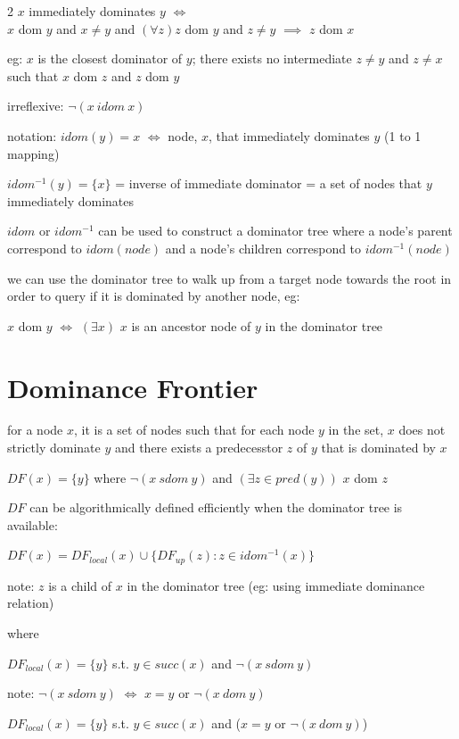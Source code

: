 \documentclass[8pt]{extarticle}
\begin{document}
\begin{multicols*}{2}
  $x$ immediately dominates $y$ $\iff$\\
  $x$ dom $y$ and $x \neq y$ and $(\forall z) z$ dom $y$ and $z \neq y$ $\implies$ $z$ dom $x$

  eg: $x$ is the closest dominator of $y$; there exists no intermediate $z \neq y$ and $z \neq x$ such that $x$ dom $z$ and $z$ dom $y$

  irreflexive: $\neg(x\ idom\ x)$

  notation: $idom(y) = x$ $\iff$ node, $x$, that immediately dominates $y$ (1 to 1 mapping)

  $idom^{-1}(y) = \{ x \}$ = inverse of immediate dominator = a set of nodes that $y$ immediately dominates

  $idom$ or $idom^{-1}$ can be used to construct a dominator tree where a node's parent correspond to $idom(node)$ and a node's children correspond to $idom^{-1}(node)$

  we can use the dominator tree to walk up from a target node towards the root in order to query if it is dominated by another node, eg:
  
  $x$ dom $y$ $\iff$ $(\exists x)$ $x$ is an ancestor node of $y$ in the dominator tree

  \vfill\null
  \columnbreak
    
  \section{Dominance Frontier}

  for a node $x$, it is a set of nodes such that for each node $y$ in the set, $x$ does not strictly dominate $y$ and there exists a predecesstor $z$ of $y$ that is dominated by $x$

  $DF(x) = \{ y \}$ where $\neg(x\ sdom\ y)$ and $(\exists z \in pred(y))$ $x$ dom $z$

  $DF$ can be algorithmically defined efficiently when the dominator tree is available:

  $DF(x) = DF_{local}(x) \cup \{ DF_{up}(z) : z \in idom^{-1}(x) \}$

  note: $z$ is a child of $x$ in the dominator tree (eg: using immediate dominance relation)
  
  where

  $DF_{local}(x) = \{y\}$ s.t. $y \in succ(x)$ and $\neg(x\ sdom\ y)$

  note: $\neg(x\ sdom\ y)$ $\iff$ $x=y$ or $\neg(x\ dom\ y)$
  
  $DF_{local}(x) = \{y\}$ s.t. $y \in succ(x)$ and ($x=y$ or $\neg(x\ dom\ y)$)


\end{multicols*}
\end{document}

